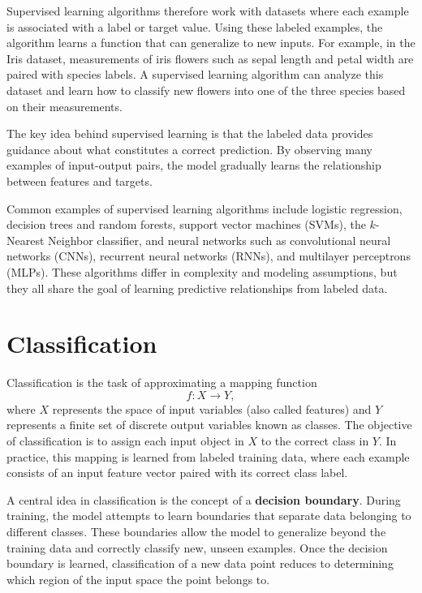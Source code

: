 \documentclass{article}
\begin{document}
Supervised learning algorithms therefore work with datasets where each example is associated with a label or target value. Using these labeled examples, the algorithm learns a function that can generalize to new inputs. For example, in the Iris dataset, measurements of iris flowers such as sepal length and petal width are paired with species labels. A supervised learning algorithm can analyze this dataset and learn how to classify new flowers into one of the three species based on their measurements.

The key idea behind supervised learning is that the labeled data provides guidance about what constitutes a correct prediction. By observing many examples of input-output pairs, the model gradually learns the relationship between features and targets.

Common examples of supervised learning algorithms include logistic regression, decision trees and random forests, support vector machines (SVMs), the $k$-Nearest Neighbor classifier, and neural networks such as convolutional neural networks (CNNs), recurrent neural networks (RNNs), and multilayer perceptrons (MLPs). These algorithms differ in complexity and modeling assumptions, but they all share the goal of learning predictive relationships from labeled data.

\section{Classification}

Classification is the task of approximating a mapping function 
\[
f: X \rightarrow Y,
\]
where \(X\) represents the space of input variables (also called features) and \(Y\) represents a finite set of discrete output variables known as classes. The objective of classification is to assign each input object in \(X\) to the correct class in \(Y\). In practice, this mapping is learned from labeled training data, where each example consists of an input feature vector paired with its correct class label.

A central idea in classification is the concept of a \textbf{decision boundary}. During training, the model attempts to learn boundaries that separate data belonging to different classes. These boundaries allow the model to generalize beyond the training data and correctly classify new, unseen examples. Once the decision boundary is learned, classification of a new data point reduces to determining which region of the input space the point belongs to.
\end{document}
